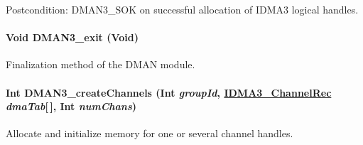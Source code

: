 \begin{Desc}
\item[Postcondition:]DMAN3\_\-SOK on successful allocation of IDMA3 logical handles. \end{Desc}
\hypertarget{group___d_s_p_d_m_a_n3_gc26a2a6153c50b10dc3ae9106bfa8594}{
\paragraph[DMAN3\_\-exit]{\setlength{\rightskip}{0pt plus 5cm}Void DMAN3\_\-exit (Void)}\hfill}
\label{group___d_s_p_d_m_a_n3_gc26a2a6153c50b10dc3ae9106bfa8594}


Finalization method of the DMAN module. 

\hypertarget{group___d_s_p_d_m_a_n3_gee927c5ad460e5e5a122471ccb047db1}{
\paragraph[DMAN3\_\-createChannels]{\setlength{\rightskip}{0pt plus 5cm}Int DMAN3\_\-create\-Channels (Int {\em group\-Id}, \hyperlink{struct_i_d_m_a3___channel_rec}{IDMA3\_\-Channel\-Rec} {\em dma\-Tab}\mbox{[}$\,$\mbox{]}, Int {\em num\-Chans})}\hfill}
\label{group___d_s_p_d_m_a_n3_gee927c5ad460e5e5a122471ccb047db1}


Allocate and initialize memory for one or several channel handles. 

